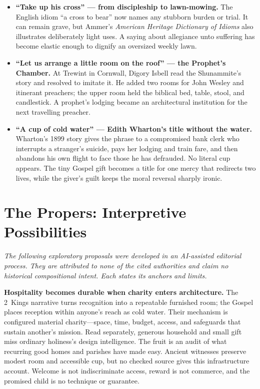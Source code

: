 {\small
\begin{itemize}
\item \textbf{“Take up his cross” --- from discipleship to lawn-mowing.\enspace{}} The English idiom “a cross to bear” now names any stubborn burden or trial. It can remain grave, but Ammer's \emph{American Heritage Dictionary of Idioms} also illustrates deliberately light uses. A saying about allegiance unto suffering has become elastic enough to dignify an oversized weekly lawn.

\item \textbf{“Let us arrange a little room on the roof” --- the Prophet's Chamber.\enspace{}} At Trewint in Cornwall, Digory Isbell read the Shunammite's story and resolved to imitate it. He added two rooms for John Wesley and itinerant preachers; the upper room held the biblical bed, table, stool, and candlestick. A prophet's lodging became an architectural institution for the next travelling preacher.

\item \textbf{“A cup of cold water” --- Edith Wharton's title without the water.\enspace{}} Wharton's 1899 story gives the phrase to a compromised bank clerk who interrupts a stranger's suicide, pays her lodging and train fare, and then abandons his own flight to face those he has defrauded. No literal cup appears. The tiny Gospel gift becomes a title for one mercy that redirects two lives, while the giver's guilt keeps the moral reversal sharply ironic.
\end{itemize}
}

\section*{The Propers: Interpretive Possibilities}

\noindent\emph{The following exploratory proposals were developed in an AI-assisted editorial process. They are attributed to none of the cited authorities and claim no historical compositional intent. Each states its anchors and limits.}

\noindent\textbf{Hospitality becomes durable when charity enters architecture.\enspace{}}
The 2~Kings narrative turns recognition into a repeatable furnished room; the Gospel places reception within anyone's reach as cold water. Their mechanism is configured material charity---space, time, budget, access, and safeguards that sustain another's mission. Read separately, generous household and small gift miss ordinary holiness's design intelligence. The fruit is an audit of what recurring good homes and parishes have made easy. Ancient witnesses preserve modest room and accessible cup, but no checked source gives this infrastructure account. Welcome is not indiscriminate access, reward is not commerce, and the promised child is no technique or guarantee.

